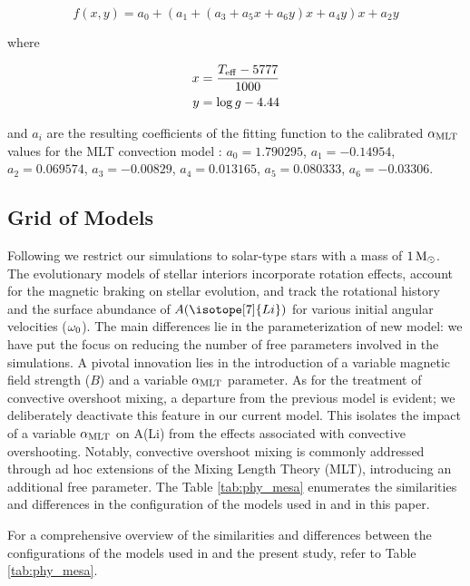 \documentclass[fleqn,usenatbib]{mnras}
\begin{document}
\begin{ceqn}
\begin{equation}
 f(x,y) = a_0 + (a_1 + (a_3 + a_5x +a_6y)x + a_4y)x + a_2y\label{eq:alpha_ml}
\end{equation}
\end{ceqn}
where
\begin{ceqn}
\begin{align}
     x &= \frac{T_{\mathrm{eff}}-5777}{1000} \label{eq:eq:alpha_x}\\
     y &= \mathrm{log} \, g-4.44 \label{eq:eq:alpha_y}
\end{align}
\end{ceqn}
and $a_i$ are the resulting coefficients of the fitting function to the calibrated $\alpha_{\mathrm{MLT}}$ values for the MLT convection model \citep{Sonoi2018}: $a_0=1.790295$, $a_1=-0.14954$, $a_2=0.069574$, $a_3=-0.00829$, $a_4=0.013165$, $a_5=0.080333$, $a_6=-0.03306$.\par

\subsection{Grid of Models} \label{sec_grid}
Following \citet{Caballero2020} we restrict our simulations to solar-type stars with a mass of $1\,\mathrm{M}_\odot$. The evolutionary models of stellar interiors incorporate rotation effects, account for the magnetic braking on stellar evolution, and track the rotational history and the surface abundance of $A(\isotope[7]{Li})$ for various initial angular velocities ($\omega_{\mathrm{0}}$). The main differences lie in the parameterization of new model: we have put the focus on reducing the number of free parameters involved in the simulations. A pivotal innovation lies in the introduction of a variable magnetic field strength ($B$) and a variable $\alpha_{\mathrm{MLT}}$ parameter. As for the treatment of convective overshoot mixing, a departure from the previous model is evident; we deliberately deactivate this feature in our current model. This isolates the impact of a variable $\alpha_{\mathrm{MLT}}$ on A(Li) from the effects associated with convective overshooting. Notably, convective overshoot mixing is commonly addressed through ad hoc extensions of the Mixing Length Theory (MLT), introducing an additional free parameter. The Table \ref{tab:phy_mesa} enumerates the similarities and differences in the configuration of the models used in \citet{Caballero2020} and in this paper.\par

For a comprehensive overview of the similarities and differences between the configurations of the models used in \citet{Caballero2020} and the present study, refer to Table \ref{tab:phy_mesa}.
\end{document}
